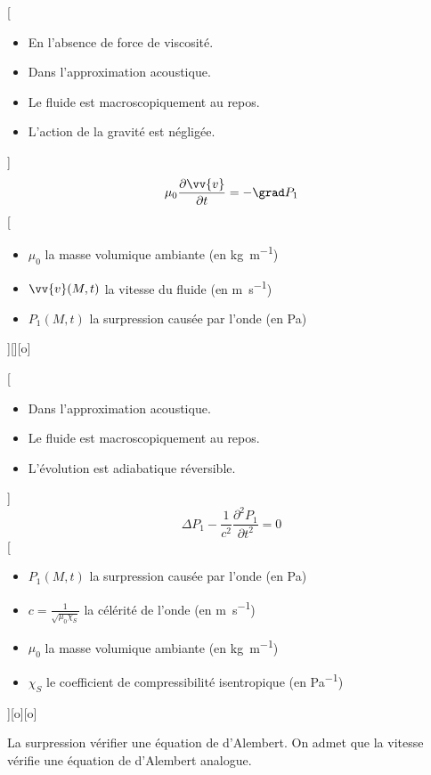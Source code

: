 [
    \begin{itemize}
        \item En l'absence de force de viscosité.
        \item Dans l'approximation acoustique.
        \item Le fluide est macroscopiquement au repos.
        \item L'action de la gravité est négligée.
    \end{itemize}
]
{
    $$\mu_0\frac{\partial \vv{v}}{\partial t}=-\grad P_1$$
}
[
    \begin{itemize}
        \item $\mu_0$ la masse volumique ambiante (en \unit{kg.m^{-1}})
        \item $\vv{v}(M,t)$ la vitesse du fluide (en \unit{m.s^{-1}})
        \item $P_1(M,t)$ la surpression causée par l'onde (en \unit{Pa})
    \end{itemize}
][][o]

[
    \begin{itemize}
        \item Dans l'approximation acoustique.
        \item Le fluide est macroscopiquement au repos.
        \item L'évolution est adiabatique réversible.
    \end{itemize}
]
{
    $$\Delta P_1-\frac{1}{c^2}\frac{\partial^2 P_1}{\partial t^2}=0$$
}
[
    \begin{itemize}
        \item $P_1(M,t)$ la surpression causée par l'onde (en \unit{Pa})
        \item $c=\frac{1}{\sqrt{\mu_0 \chi_S}}$ la célérité de l'onde (en \unit{m.s^{-1}})
        \item $\mu_0$ la masse volumique ambiante (en \unit{kg.m^{-1}})
        \item $\chi_S$ le coefficient de compressibilité isentropique (en \unit{Pa^{-1}})
    \end{itemize}
][o][o]

La surpression vérifier une équation de d'Alembert. On admet que la vitesse vérifie une équation de d'Alembert analogue.

